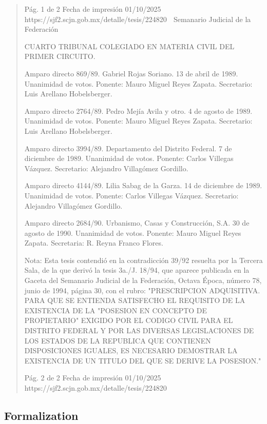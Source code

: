 \documentclass[11pt,a4paper]{article}
\begin{document}
\begin{quote}
                                              Pág. 1 de 2              Fecha de impresión 01/10/2025
  https://sjf2.scjn.gob.mx/detalle/tesis/224820
                                                  Semanario Judicial de la Federación

CUARTO TRIBUNAL COLEGIADO EN MATERIA CIVIL DEL PRIMER CIRCUITO.


Amparo directo 869/89. Gabriel Rojas Soriano. 13 de abril de 1989. Unanimidad de votos. Ponente:
Mauro Miguel Reyes Zapata. Secretario: Luis Arellano Hobelsberger.

Amparo directo 2764/89. Pedro Mejía Avila y otro. 4 de agosto de 1989. Unanimidad de votos.
Ponente: Mauro Miguel Reyes Zapata. Secretario: Luis Arellano Hobelsberger.

Amparo directo 3994/89. Departamento del Distrito Federal. 7 de diciembre de 1989. Unanimidad de
votos. Ponente: Carlos Villegas Vázquez. Secretario: Alejandro Villagómez Gordillo.

Amparo directo 4144/89. Lilia Sabag de la Garza. 14 de diciembre de 1989. Unanimidad de votos.
Ponente: Carlos Villegas Vázquez. Secretario: Alejandro Villagómez Gordillo.

Amparo directo 2684/90. Urbanismo, Casas y Construcción, S.A. 30 de agosto de 1990.
Unanimidad de votos. Ponente: Mauro Miguel Reyes Zapata. Secretaria: R. Reyna Franco Flores.

Nota: Esta tesis contendió en la contradicción 39/92 resuelta por la Tercera Sala, de la que derivó la
tesis 3a./J. 18/94, que aparece publicada en la Gaceta del Semanario Judicial de la Federación,
Octava Época, número 78, junio de 1994, página 30, con el rubro: "PRESCRIPCION ADQUISITIVA.
PARA QUE SE ENTIENDA SATISFECHO EL REQUISITO DE LA EXISTENCIA DE LA "POSESION
EN CONCEPTO DE PROPIETARIO" EXIGIDO POR EL CODIGO CIVIL PARA EL DISTRITO
FEDERAL Y POR LAS DIVERSAS LEGISLACIONES DE LOS ESTADOS DE LA REPUBLICA QUE
CONTIENEN DISPOSICIONES IGUALES, ES NECESARIO DEMOSTRAR LA EXISTENCIA DE UN
TITULO DEL QUE SE DERIVE LA POSESION."




                                             Pág. 2 de 2             Fecha de impresión 01/10/2025
  https://sjf2.scjn.gob.mx/detalle/tesis/224820

\end{quote}

\subsection{Formalization}
\end{document}
